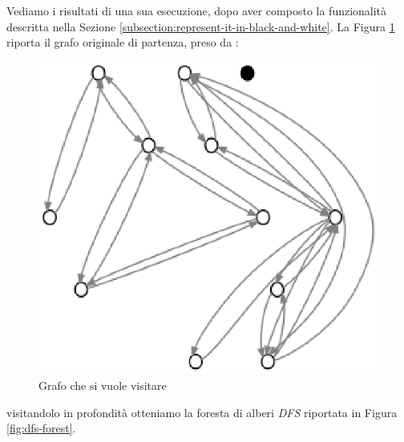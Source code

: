 Vediamo i risultati di una sua esecuzione, dopo aver composto la
funzionalit\`a descritta nella Sezione
\ref{subsection:represent-it-in-black-and-white}. La Figura
\ref{fig:before-applying-dfs-search} riporta il grafo originale di
partenza, preso da \cite{Algorithms}:
\begin{figure}
  \centering
  \includegraphics{images/OnePipingLevelUnitTest_Printer_DFS_PrinterPipe_Papadimitriou-phase-PrinterPipeFilter-level-0.eps}
  \caption{Grafo che si vuole visitare}
  \label{fig:before-applying-dfs-search}
\end{figure}
visitandolo in profondit\`a otteniamo la foresta di alberi \emph{DFS}
riportata in Figura \ref{fig:dfs-forest}.
